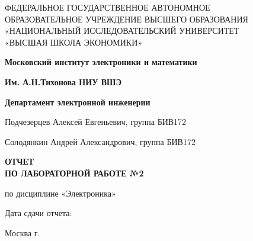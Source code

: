 \begin{titlepage}
	\begin{center}
		ФЕДЕРАЛЬНОЕ  ГОСУДАРСТВЕННОЕ АВТОНОМНОЕ \\
		ОБРАЗОВАТЕЛЬНОЕ УЧРЕЖДЕНИЕ ВЫСШЕГО ОБРАЗОВАНИЯ\\
		«НАЦИОНАЛЬНЫЙ ИССЛЕДОВАТЕЛЬСКИЙ УНИВЕРСИТЕТ\\
		«ВЫСШАЯ ШКОЛА ЭКОНОМИКИ»
	\end{center}
	
	\begin{center}
		\textbf{Московский институт электроники и математики}
		
		\textbf{Им. А.Н.Тихонова НИУ ВШЭ}
		
		\textbf{Департамент электронной инженерии}
	\end{center}
	\vspace{1ex}	
	\begin{center}
		Подчезерцев Алексей Евгеньевич, группа БИВ172
		
		Солодянкин Андрей Александрович, группа БИВ172
	\end{center}	
	\vspace{1ex}
	\begin{center}
		\textbf{ОТЧЕТ\\
		ПО ЛАБОРАТОРНОЙ РАБОТЕ №2
	}
	\end{center}	
	\vspace{2ex}
	\begin{center}
		по дисциплине «Электроника»
	\end{center}
	\vspace{2ex}
	\begin{center}
	Дата сдачи отчета: \tomorrow
	\end{center}
	\vspace{2ex}
	\vfill
	\begin{center}
		Москва \the\year г.
	\end{center}
\end{titlepage}